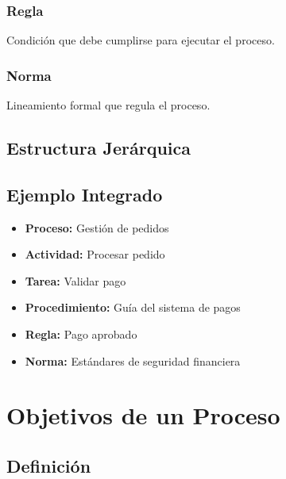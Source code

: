 \documentclass[12pt,a4paper]{article}
\begin{document}
\subsubsection{Regla}
Condición que debe cumplirse para ejecutar el proceso.

\subsubsection{Norma}
Lineamiento formal que regula el proceso.

\subsection{Estructura Jerárquica}

\begin{center}
\end{center}

\subsection{Ejemplo Integrado}

\begin{itemize}
    \item \textbf{Proceso:} Gestión de pedidos
    \item \textbf{Actividad:} Procesar pedido
    \item \textbf{Tarea:} Validar pago
    \item \textbf{Procedimiento:} Guía del sistema de pagos
    \item \textbf{Regla:} Pago aprobado
    \item \textbf{Norma:} Estándares de seguridad financiera
\end{itemize}

\section{Objetivos de un Proceso}

\subsection{Definición}
\end{document}
